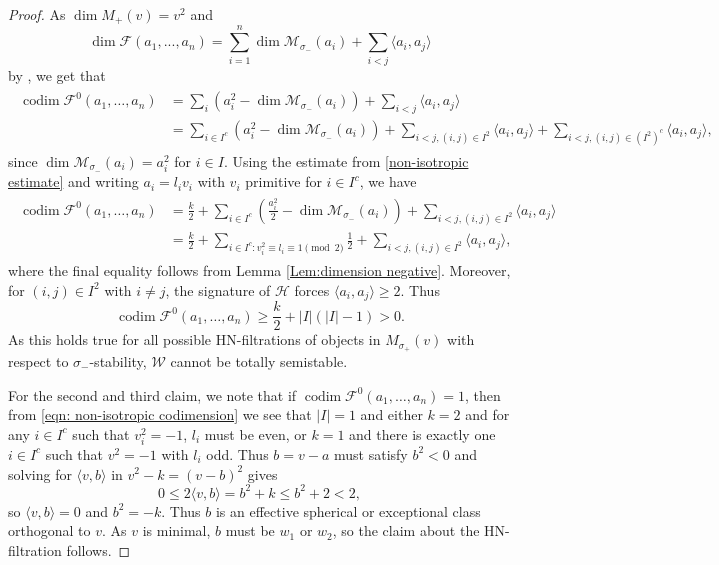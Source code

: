 \documentclass[leqno,11pt]{amsart}
\def\codim{\mathop{\mathrm{codim}}\nolimits}
\def\dim{\mathop{\mathrm{dim}}\nolimits}
\theoremstyle{definition}
\def\FF{\ensuremath{\mathcal F}}
\def\HH{\ensuremath{\mathcal H}}
\def\MM{\ensuremath{\mathcal M}}
\def\WW{\ensuremath{\mathcal W}}
\begin{document}
\begin{proof}
As $\dim M_+(v)=v^2$ and 
$$\dim \FF(a_1,...,a_n)=\sum_{i=1}^n\dim\MM_{\sigma_-}(a_i)+
\sum_{i<j}\langle a_i,a_j\rangle$$ by \cite[Lemma 5.3]{KY08}, we get that \begin{align}\label{codim estimate}
\begin{split}\codim\FF^0(a_1,\ldots,a_n)&=\sum_i (a_i^2-\dim\MM_{\sigma_-}(a_i))+\sum_{i<j}\langle a_i,a_j\rangle\\
&=\sum_{i\in I^c}(a_i^2-\dim\MM_{\sigma_-}(a_i))+\sum_{i<j,(i,j)\in I^2}\langle a_i,a_j\rangle+\sum_{i<j,(i,j)\in (I^2)^c}\langle a_i,a_j\rangle, 
\end{split}
\end{align}
since $\dim\MM_{\sigma_-}(a_i)=a_i^2$ for $i\in I$.  Using the estimate from \eqref{non-isotropic estimate} and writing $a_i=l_i v_i$ with $v_i$ primitive for $i\in I^c$, we have
\begin{align}\label{eqn: non-isotropic codimension}
\begin{split}
\codim\FF^0(a_1,\ldots,a_n)&=\frac{k}{2}+\sum_{i\in I^c}(\frac{a_i^2}{2}-\dim\MM_{\sigma_-}(a_i))+\sum_{i<j,(i,j)\in I^2}\langle a_i,a_j\rangle\\
&=\frac{k}{2}+\sum_{i\in I^c:v_i^2\equiv l_i\equiv 1\pmod 2}\frac{1}{2}+\sum_{i<j,(i,j)\in I^2}\langle a_i,a_j\rangle,
\end{split}
\end{align}
where the final equality follows from Lemma \ref{Lem:dimension negative}.  Moreover, for $(i,j)\in I^2$ with $i\neq j$, the signature of $\HH$ forces $\langle a_i,a_j\rangle\geq 2$.  Thus $$\codim\FF^0(a_1,\ldots,a_n)\geq \frac{k}{2}+|I|(|I|-1)>0.$$  As this holds true for all possible HN-filtrations of objects in $M_{\sigma_+}(v)$ with respect to $\sigma_-$-stability, $\WW$ cannot be totally semistable.  

For the second and third claim, we note that if $\codim\FF^0(a_1,\ldots,a_n)=1$, then from \eqref{eqn: non-isotropic codimension} we see that $|I|=1$ and either $k=2$ and for any $i\in I^c$ such that $v_i^2=-1$, $l_i$ must be even, or $k=1$ and there is exactly one $i\in I^c$ such that $v^2=-1$ with $l_i$ odd.  Thus $b=v-a$ must satisfy $b^2<0$ and solving for $\langle v,b\rangle$ in $v^2-k=(v-b)^2$ gives $$0\leq 2\langle v,b\rangle=b^2+k\leq b^2+2<2,$$ so $\langle v,b\rangle=0$ and $b^2=-k$.  Thus $b$ is an effective spherical or exceptional class orthogonal to $v$.  As $v$ is minimal, $b$ must be $w_1$ or $w_2$, so the claim about the HN-filtration follows.   
\end{proof}
\end{document}
